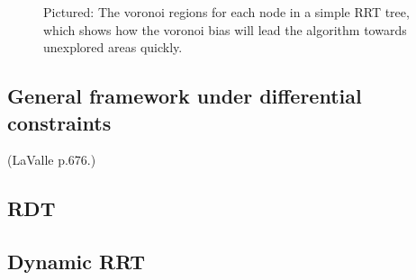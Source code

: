 \begin{figure}
  \label{fig:rrt-voronoi}
  \caption{Pictured: The voronoi regions for each node in a simple RRT tree,
    which shows how the voronoi bias will lead the algorithm towards unexplored
    areas quickly.}
\end{figure}

\subsection{General framework under differential constraints} (LaValle p.676.)


\subsection{RDT}


\subsection{Dynamic RRT}

